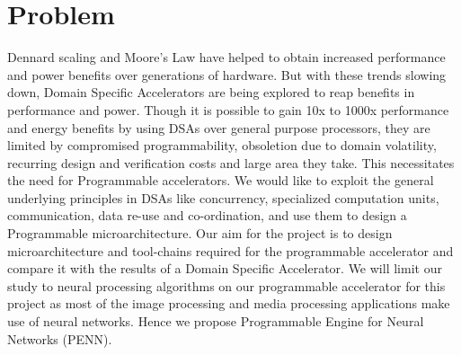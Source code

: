 \section{Problem}\label{sec:prob}

Dennard scaling and Moore's Law have helped to obtain increased performance and power benefits over generations of hardware. But with these trends slowing down, Domain Specific Accelerators are being explored to reap benefits in performance and power. Though it is possible to gain 10x to 1000x performance and energy benefits by using DSAs over general purpose processors, they are limited by compromised programmability, obsoletion due to domain volatility, recurring design and verification costs and large area they take. This necessitates the need for Programmable accelerators. 
We would like to exploit the general underlying principles in DSAs like concurrency, specialized computation units, communication, data re-use and co-ordination, and use them to design a Programmable microarchitecture. Our aim for the project is to design microarchitecture and tool-chains required for the programmable accelerator and compare it with the results of a Domain Specific Accelerator. We will limit our study to neural processing algorithms on our programmable accelerator for this project as most of the image processing and media processing applications make use of neural networks. Hence we propose Programmable Engine for Neural Networks (PENN). 
